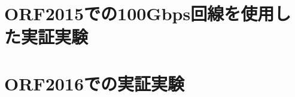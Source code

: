\chapter{ORF2015での100Gbps回線を使用した実証実験}
\label{chap:orf2015}

\chapter{ORF2016での実証実験}
\label{chap:orf2016}
